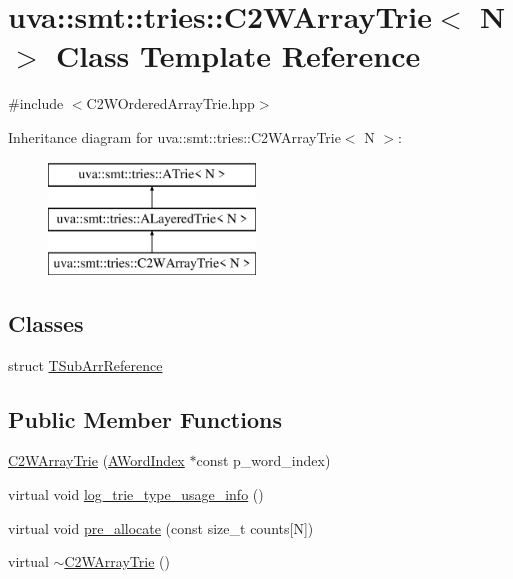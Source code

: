 \hypertarget{classuva_1_1smt_1_1tries_1_1_c2_w_array_trie}{}\section{uva\+:\+:smt\+:\+:tries\+:\+:C2\+W\+Array\+Trie$<$ N $>$ Class Template Reference}
\label{classuva_1_1smt_1_1tries_1_1_c2_w_array_trie}


{\ttfamily \#include $<$C2\+W\+Ordered\+Array\+Trie.\+hpp$>$}

Inheritance diagram for uva\+:\+:smt\+:\+:tries\+:\+:C2\+W\+Array\+Trie$<$ N $>$\+:\begin{figure}[H]
\begin{center}
\leavevmode
\includegraphics[height=3.000000cm]{classuva_1_1smt_1_1tries_1_1_c2_w_array_trie}
\end{center}
\end{figure}
\subsection*{Classes}
\begin{DoxyCompactItemize}
\item 
struct \hyperlink{structuva_1_1smt_1_1tries_1_1_c2_w_array_trie_1_1_t_sub_arr_reference}{T\+Sub\+Arr\+Reference}
\end{DoxyCompactItemize}
\subsection*{Public Member Functions}
\begin{DoxyCompactItemize}
\item 
\hyperlink{classuva_1_1smt_1_1tries_1_1_c2_w_array_trie_aadada060b7c42403b032a5c6ecef57d5}{C2\+W\+Array\+Trie} (\hyperlink{classuva_1_1smt_1_1tries_1_1dictionary_1_1_a_word_index}{A\+Word\+Index} $\ast$const p\+\_\+word\+\_\+index)
\item 
virtual void \hyperlink{classuva_1_1smt_1_1tries_1_1_c2_w_array_trie_a29d456f70c6d4d9f6c6cda728a3c1b60}{log\+\_\+trie\+\_\+type\+\_\+usage\+\_\+info} ()
\item 
virtual void \hyperlink{classuva_1_1smt_1_1tries_1_1_c2_w_array_trie_a2d50b57e823218056c32846ac1002276}{pre\+\_\+allocate} (const size\+\_\+t counts\mbox{[}N\mbox{]})
\item 
virtual \hyperlink{classuva_1_1smt_1_1tries_1_1_c2_w_array_trie_a989f9930b05ed3b6dbe5edc7b704ea86}{$\sim$\+C2\+W\+Array\+Trie} ()
\end{DoxyCompactItemize}
